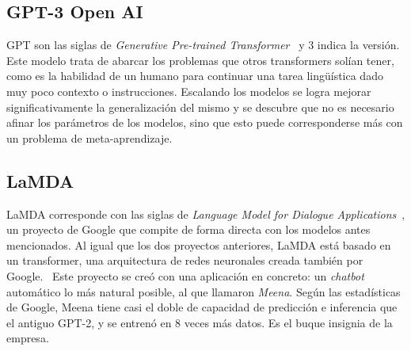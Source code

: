 \subsection{GPT-3 Open AI}
GPT son las siglas de \textit{Generative Pre-trained Transformer}~\cite{GPT3openAI2020} y 3 indica la versión. Este modelo trata de abarcar los problemas que otros transformers solían tener, como es la habilidad de un humano para continuar una tarea lingüística dado muy poco contexto o instrucciones. Escalando los modelos se logra mejorar significativamente la generalización del mismo y se descubre que no es necesario afinar los parámetros de los modelos, sino que esto puede corresponderse más con un problema de meta-aprendizaje.



\subsection{LaMDA}
LaMDA corresponde con las siglas de \textit{Language Model for Dialogue Applications}~\cite{LaMDAGoogle2020}, un proyecto de Google que compite de forma directa con los modelos antes mencionados. Al igual que los dos proyectos anteriores, LaMDA está basado en un transformer, una arquitectura de redes neuronales creada también por Google.~\cite{TransformerAshish2017} Este proyecto se creó con una aplicación en concreto: un \textit{chatbot} automático lo más natural posible, al que llamaron \textit{Meena}. Según las estadísticas de Google, Meena tiene casi el doble de capacidad de predicción e inferencia que el antiguo GPT-2, y se entrenó en 8 veces más datos. Es el buque insignia de la empresa.


